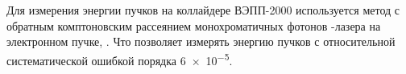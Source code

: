 
Для измерения энергии пучков на коллайдере ВЭПП-2000 используется метод с обратным комптоновским рассеянием монохроматичных фотонов -лазера на электронном пучке, \cite{laserBeamAbakumova2014}.
Что позволяет измерять энергию пучков с относительной систематической ошибкой порядка \num{6e-5}.



